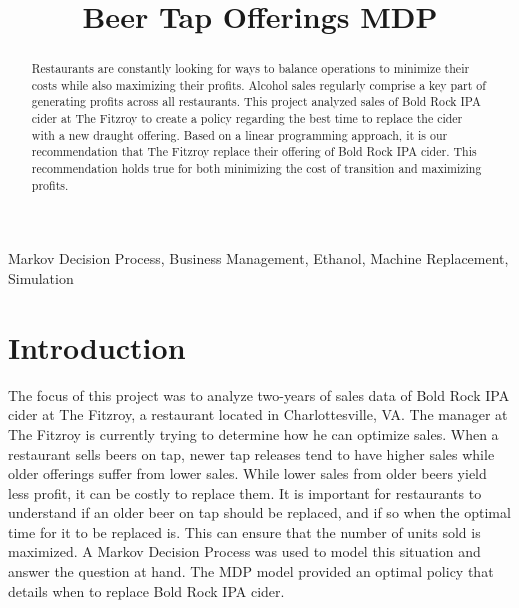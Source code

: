 \documentclass[conference]{IEEEtran}
\begin{document}
\title{Beer Tap Offerings MDP\\}

\author{
\and
{}
\and
{}
\and
{}

}

\maketitle

\begin{abstract}
Restaurants are constantly looking for ways to balance operations to minimize their costs while also maximizing their profits.  Alcohol sales regularly comprise a key part of generating profits across all restaurants.  This project analyzed sales of Bold Rock IPA cider at The Fitzroy to create a policy regarding the best time to replace the cider with a new draught offering.  Based on a linear programming approach, it is our recommendation that The Fitzroy replace their offering of Bold Rock IPA cider.  This recommendation holds true for both minimizing the cost of transition and maximizing profits.

\end{abstract}

\begin{IEEEkeywords}
Markov Decision Process, Business Management, Ethanol, Machine Replacement, Simulation
\end{IEEEkeywords}

\section{Introduction}
The focus of this project was to analyze two-years of sales data of Bold Rock IPA cider at The Fitzroy, a restaurant located in Charlottesville, VA. The manager at The Fitzroy is currently trying to determine how he can optimize sales. When a restaurant sells beers on tap, newer tap releases tend to have higher sales while older offerings suffer from lower sales. While lower sales from older beers yield less profit, it can be costly to replace them. It is important for restaurants to understand if an older beer on tap should be replaced, and if so when the optimal time for it to be replaced is. This can ensure that the number of units sold is maximized. A Markov Decision Process was used to model this situation and answer the question at hand. The MDP model provided an optimal policy that details when to replace Bold Rock IPA cider.
\end{document}
